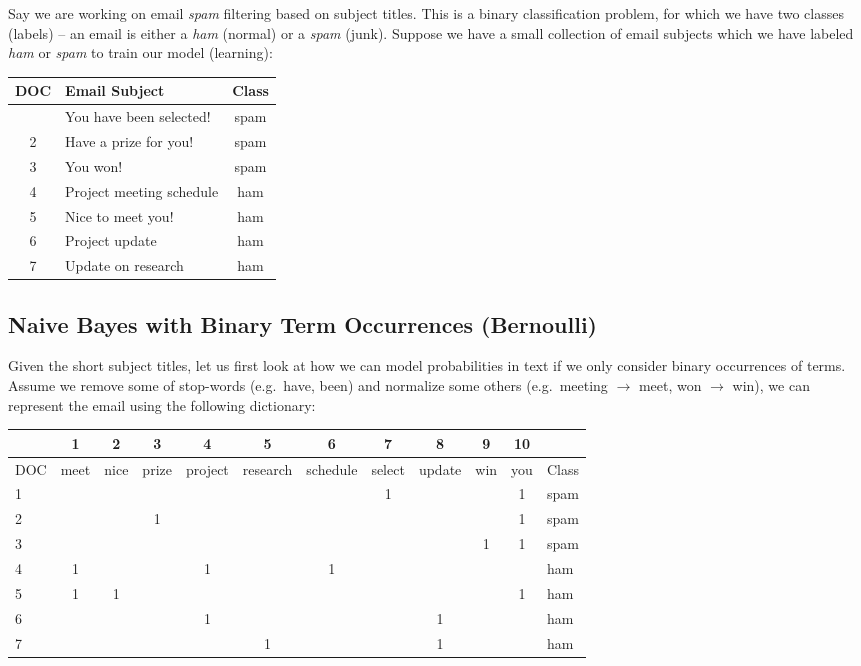 \documentclass[
  letterpaper,
]{scrbook}
\newcounter{none} %
\begin{document}
Say we are working on email \emph{spam} filtering based on subject
titles. This is a binary classification problem, for which we have two
classes (labels) -- an email is either a \emph{ham} (normal) or a
\emph{spam} (junk). Suppose we have a small collection of email subjects
which we have labeled \emph{ham} or \emph{spam} to train our model
(learning):

{\def\LTcaptype{none} %
\begin{longtable}[]{@{}clc@{}}
\toprule\noalign{}
DOC & Email Subject & Class \\
\midrule\noalign{}
\endhead
\bottomrule\noalign{}
\endlastfoot
1 & You have been selected! & spam \\
2 & Have a prize for you! & spam \\
3 & You won! & spam \\
4 & Project meeting schedule & ham \\
5 & Nice to meet you! & ham \\
6 & Project update & ham \\
7 & Update on research & ham \\
\end{longtable}
}

\protect{}\label{tab-text-emails}{}

\subsection{Naive Bayes with Binary Term Occurrences
(Bernoulli)}\label{naive-bayes-with-binary-term-occurrences-bernoulli}

Given the short subject titles, let us first look at how we can model
probabilities in text if we only consider binary occurrences of terms.
Assume we remove some of stop-words (e.g.~have, been) and normalize some
others (e.g.~meeting \(\to\) meet, won \(\to\) win), we can represent
the email using the following dictionary:

{\def\LTcaptype{none} %
\begin{longtable}[]{@{}lccccccccccl@{}}
\toprule\noalign{}
& 1 & 2 & 3 & 4 & 5 & 6 & 7 & 8 & 9 & 10 & \\
\midrule\noalign{}
\endhead
\bottomrule\noalign{}
\endlastfoot
DOC & meet & nice & prize & project & research & schedule & select &
update & win & you & Class \\
1 & & & & & & & 1 & & & 1 & spam \\
2 & & & 1 & & & & & & & 1 & spam \\
3 & & & & & & & & & 1 & 1 & spam \\
4 & 1 & & & 1 & & 1 & & & & & ham \\
5 & 1 & 1 & & & & & & & & 1 & ham \\
6 & & & & 1 & & & & 1 & & & ham \\
7 & & & & & 1 & & & 1 & & & ham \\
\end{longtable}
}
\end{document}
